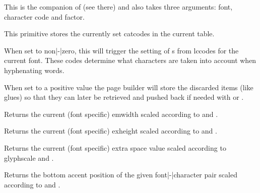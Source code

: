 \stopoldprimitive

\startnewprimitive[title={\prm {rpcode}}]

This is the companion of  (see there) and also takes three
arguments: font, character code and factor.

\stopnewprimitive

\startnewprimitive[title={\prm {savecatcodetable}}]

This primitive stores the currently set catcodes in the current table.

\stopnewprimitive

\startoldprimitive[title={\prm {savinghyphcodes}}]

When set to non|-|zero, this will trigger the setting of s from \prm
{lccode}s for the current font. These codes determine what characters are taken
into account when hyphenating words.

\stopoldprimitive

\startoldprimitive[title={\prm {savingvdiscards}}]

When set to a positive value the page builder will store the discarded items
(like glues) so that they can later be retrieved and pushed back if needed with
 or .

\stopoldprimitive

\startnewprimitive[title={\prm {scaledemwidth}}]

Returns the current (font specific) emwidth scaled according to 
and .

\stopnewprimitive

\startnewprimitive[title={\prm {scaledexheight}}]

Returns the current (font specific) exheight scaled according to 
and .

\stopnewprimitive

\startnewprimitive[title={\prm {scaledextraspace}}]

Returns the current (font specific) extra space value scaled according to \prm
{glyphscale} and .

\stopnewprimitive

\startnewprimitive[title={\prm {scaledfontcharba}}]

Returns the bottom accent position of the given font|-|character pair scaled
according to  and .

\stopnewprimitive

